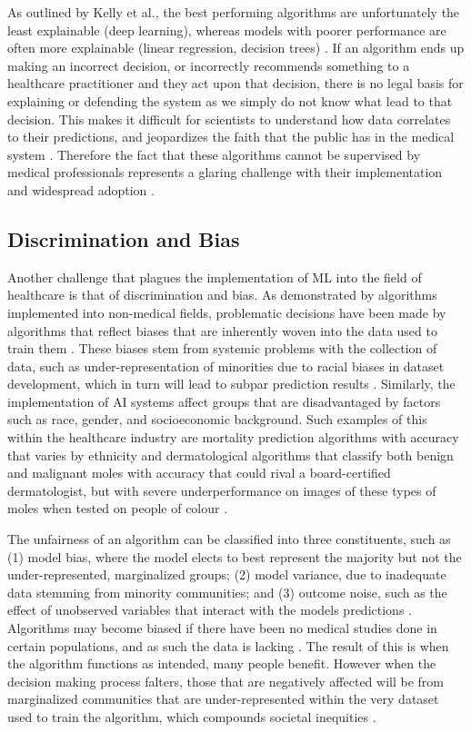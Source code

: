 \documentclass[12pt]{article}
\begin{document}
As outlined by Kelly et al., the best performing algorithms are unfortunately the least explainable (deep learning), whereas models with poorer performance are often more explainable (linear regression, decision trees) \cite{Kelly_2019}. If an algorithm ends up making an incorrect decision, or incorrectly recommends something to a healthcare practitioner and they act upon that decision, there is no legal basis for explaining or defending the system as we simply do not know what lead to that decision. This makes it difficult for scientists to understand how data correlates to their predictions, and jeopardizes the faith that the public has in the medical system \cite{Khan_2023}. Therefore the fact that these algorithms cannot be supervised by medical professionals represents a glaring challenge with their implementation and widespread adoption \cite{Murdoch_2021}.

\vspace{-5mm}
\subsection{Discrimination and Bias}

Another challenge that plagues the implementation of ML into the field of healthcare is that of discrimination and bias. As demonstrated by algorithms implemented into non-medical fields, problematic decisions have been
made by algorithms that reflect biases that are inherently woven into the data used to train them \cite{Char_2018,Khan_2023,Kelly_2019}. These biases stem from systemic problems with the collection of data, such as under-representation of minorities due to racial biases in dataset development, which in turn will lead to subpar prediction results \cite{Khan_2023}. Similarly, 
the implementation of AI systems affect groups that are disadvantaged by factors such as race, gender, and socioeconomic background. Such examples of this within the healthcare industry are mortality prediction algorithms
with accuracy that varies by ethnicity \cite{Chen_2018} and dermatological algorithms that classify both benign and malignant moles with accuracy that could rival a board-certified dermatologist, but with severe underperformance on images of these types of moles when tested on people of colour \cite{Esteva_2017,Haenssle_2019}. \ 

\newpage

The unfairness of an algorithm can be classified into three constituents, such as (1) model bias, where the model elects to best represent the majority but not the under-represented, marginalized groups; (2) model variance, due to inadequate data stemming from minority communities; and (3) outcome noise, such as the effect of unobserved variables that interact with the models predictions \cite{Chen_2018}. 
Algorithms may become biased if there have been no medical studies done in certain populations, and as such the data is lacking \cite{Char_2018}. The result of this is when the algorithm functions as intended, many people benefit. However when the decision making process falters, those that are negatively affected will be from marginalized communities that are under-represented within the very dataset used to train the algorithm, which compounds societal inequities \cite{Panch_2018}.
\end{document}
